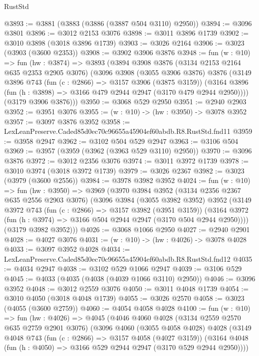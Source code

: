 \begin{lexlean}{RustStd}
\begin{coremodule}
@3893 := @3881 (@3883 (@3886 (@3887 @504 @3110) @2950))
@3894 := @3096 @3801
@3896 := @3012 @2153 @3076
@3898 := @3011 @3896 @1739
@3902 := @3010 @3898 (@3018 @3896 @1739)
@3903 := @3026 @2164
@3906 := @3023 (@3903 (@3600 @2353))
@3908 := @3902 @3906 @3876
@3948 := fun (w : @10) =>
  fun (hw : @3874) =>
  @3893
    (@3894
      @3908
      @3876
      (@3134 @2153 @2164 @635 @2353 @2905 @3076)
      (@3096
        @3908
        (@3055 @3906 @3876)
        @3876
        (@3149
          @3896
          @743
          (fun (c : @2866) => @3157 @3906 (@3875 @3159))
          (@3164 @3896 (fun (h : @3898) => @3166 @479 @2944 @2947 (@3170 @479 @2944 @2950))))
        (@3179 @3906 @3876)))
@3950 := @3068 @529 @2950
@3951 := @2940 @2903
@3952 := @3951 @3076
@3955 := (w : @10) -> (hw : @3950) -> @3078 @3952
@3957 := @3097 @3876 @3952
@3958 := LexLeanPreserve.Caded85d0ec70c96655a45904ef60abdb.R8.RustStd.fnd11
@3959 := @3958 @2947
@3962 := @3102 @504 @529 @2947
@3963 := @3106 @504
@3969 := @3957 (@3959 (@3962 (@3963 @529 @3110) @2950))
@3970 := @3096 @3876
@3972 := @3012 @2356 @3076
@3974 := @3011 @3972 @1739
@3978 := @3010 @3974 (@3018 @3972 @1739)
@3979 := @3026 @2367
@3982 := @3023 (@3979 (@3600 @2556))
@3984 := @3978 @3982 @3952
@4024 := fun (w : @10) =>
  fun (hw : @3950) =>
  @3969
    (@3970
      @3984
      @3952
      (@3134 @2356 @2367 @635 @2556 @2903 @3076)
      (@3096
        @3984
        (@3055 @3982 @3952)
        @3952
        (@3149
          @3972
          @743
          (fun (c : @2866) => @3157 @3982 (@3951 @3159))
          (@3164 @3972 (fun (h : @3974) => @3166 @504 @2944 @2947 (@3170 @504 @2944 @2950))))
        (@3179 @3982 @3952)))
@4026 := @3068 @1066 @2950
@4027 := @2940 @2901
@4028 := @4027 @3076
@4031 := (w : @10) -> (hw : @4026) -> @3078 @4028
@4033 := @3097 @3952 @4028
@4034 := LexLeanPreserve.Caded85d0ec70c96655a45904ef60abdb.R8.RustStd.fnd12
@4035 := @4034 @2947
@4038 := @3102 @529 @1066 @2947
@4039 := @3106 @529
@4045 := @4033 (@4035 (@4038 (@4039 @1066 @3110) @2950))
@4046 := @3096 @3952
@4048 := @3012 @2559 @3076
@4050 := @3011 @4048 @1739
@4054 := @3010 @4050 (@3018 @4048 @1739)
@4055 := @3026 @2570
@4058 := @3023 (@4055 (@3600 @2759))
@4060 := @4054 @4058 @4028
@4100 := fun (w : @10) =>
  fun (hw : @4026) =>
  @4045
    (@4046
      @4060
      @4028
      (@3134 @2559 @2570 @635 @2759 @2901 @3076)
      (@3096
        @4060
        (@3055 @4058 @4028)
        @4028
        (@3149
          @4048
          @743
          (fun (c : @2866) => @3157 @4058 (@4027 @3159))
          (@3164 @4048 (fun (h : @4050) => @3166 @529 @2944 @2947 (@3170 @529 @2944 @2950))))

\end{coremodule}
\end{lexlean}
